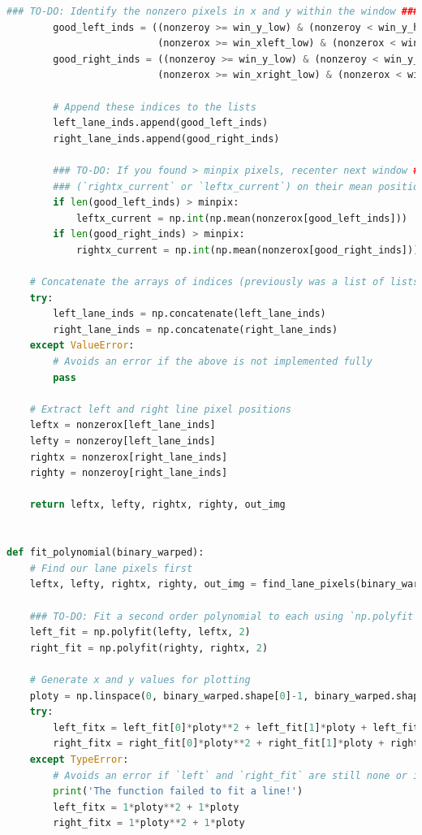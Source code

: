 \documentclass[12pt]{article}
\begin{document}
\begin{lstlisting}[language=Python]
        ### TO-DO: Identify the nonzero pixels in x and y within the window ###
        good_left_inds = ((nonzeroy >= win_y_low) & (nonzeroy < win_y_high) & 
                          (nonzerox >= win_xleft_low) & (nonzerox < win_xleft_high)).nonzero()[0]
        good_right_inds = ((nonzeroy >= win_y_low) & (nonzeroy < win_y_high) & 
                          (nonzerox >= win_xright_low) & (nonzerox < win_xright_high)).nonzero()[0]
        
        # Append these indices to the lists
        left_lane_inds.append(good_left_inds)
        right_lane_inds.append(good_right_inds)
        
        ### TO-DO: If you found > minpix pixels, recenter next window ###
        ### (`rightx_current` or `leftx_current`) on their mean position ###
        if len(good_left_inds) > minpix:
            leftx_current = np.int(np.mean(nonzerox[good_left_inds]))
        if len(good_right_inds) > minpix:
            rightx_current = np.int(np.mean(nonzerox[good_right_inds]))

    # Concatenate the arrays of indices (previously was a list of lists of pixels)
    try:
        left_lane_inds = np.concatenate(left_lane_inds)
        right_lane_inds = np.concatenate(right_lane_inds)
    except ValueError:
        # Avoids an error if the above is not implemented fully
        pass

    # Extract left and right line pixel positions
    leftx = nonzerox[left_lane_inds]
    lefty = nonzeroy[left_lane_inds] 
    rightx = nonzerox[right_lane_inds]
    righty = nonzeroy[right_lane_inds]

    return leftx, lefty, rightx, righty, out_img


def fit_polynomial(binary_warped):
    # Find our lane pixels first
    leftx, lefty, rightx, righty, out_img = find_lane_pixels(binary_warped)

    ### TO-DO: Fit a second order polynomial to each using `np.polyfit` ###
    left_fit = np.polyfit(lefty, leftx, 2)
    right_fit = np.polyfit(righty, rightx, 2)

    # Generate x and y values for plotting
    ploty = np.linspace(0, binary_warped.shape[0]-1, binary_warped.shape[0] )
    try:
        left_fitx = left_fit[0]*ploty**2 + left_fit[1]*ploty + left_fit[2]
        right_fitx = right_fit[0]*ploty**2 + right_fit[1]*ploty + right_fit[2]
    except TypeError:
        # Avoids an error if `left` and `right_fit` are still none or incorrect
        print('The function failed to fit a line!')
        left_fitx = 1*ploty**2 + 1*ploty
        right_fitx = 1*ploty**2 + 1*ploty


\end{lstlisting}
\end{document}
